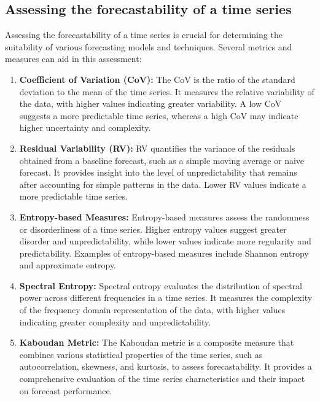 \documentclass{article}
\begin{document}
\subsection{Assessing the forecastability of a time series}

Assessing the forecastability of a time series is crucial for determining the suitability of various forecasting models and techniques. Several metrics and measures can aid in this assessment:

\begin{enumerate}
    \item \textbf{Coefficient of Variation (CoV):} The CoV is the ratio of the standard deviation to the mean of the time series. It measures the relative variability of the data, with higher values indicating greater variability. A low CoV suggests a more predictable time series, whereas a high CoV may indicate higher uncertainty and complexity.
    
    \item \textbf{Residual Variability (RV):} RV quantifies the variance of the residuals obtained from a baseline forecast, such as a simple moving average or naive forecast. It provides insight into the level of unpredictability that remains after accounting for simple patterns in the data. Lower RV values indicate a more predictable time series.
    
    \item \textbf{Entropy-based Measures:} Entropy-based measures assess the randomness or disorderliness of a time series. Higher entropy values suggest greater disorder and unpredictability, while lower values indicate more regularity and predictability. Examples of entropy-based measures include Shannon entropy and approximate entropy.
    
    \item \textbf{Spectral Entropy:} Spectral entropy evaluates the distribution of spectral power across different frequencies in a time series. It measures the complexity of the frequency domain representation of the data, with higher values indicating greater complexity and unpredictability.
    
    \item \textbf{Kaboudan Metric:} The Kaboudan metric is a composite measure that combines various statistical properties of the time series, such as autocorrelation, skewness, and kurtosis, to assess forecastability. It provides a comprehensive evaluation of the time series characteristics and their impact on forecast performance.
\end{enumerate}
\end{document}
